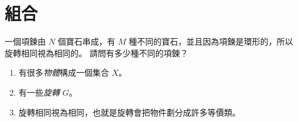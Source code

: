 \documentclass[standalone]{beamer}
\begin{document}
\section{組合}

\begin{frame}{}
  \begin{problem}[經典問題]
    一個項鍊由 $N$ 個寶石串成，有 $M$ 種不同的寶石，並且因為項鍊是環形的，所以旋轉相同視為相同的。
    請問有多少種不同的項鍊？
  \end{problem}
  \pause

  \begin{enumerate}
    \item 有很多\emph{物體}構成一個集合 $X$。
    \item 有一些\emph{旋轉} $G$。
    \item 旋轉相同視為相同，也就是旋轉會把物件劃分成許多等價類。
  \end{enumerate}
\end{frame}
\end{document}
